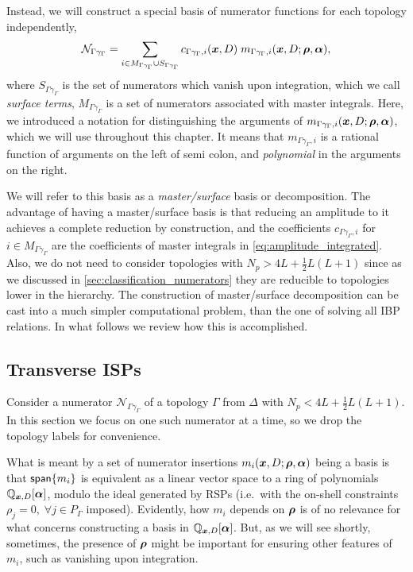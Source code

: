 Instead, we will construct a special basis of numerator functions for each topology independently,
\begin{equation} \label{eq:master_surface_basis}
  \mathcal{N}_{\Gamma \gamma_\Gamma} = \sum_{i \in M_{\Gamma\gamma_\Gamma} \cup S_{\Gamma\gamma_\Gamma}} c_{\Gamma\gamma_\Gamma, i}(\vb*{x},D) \; m_{\Gamma\gamma_\Gamma, i} (\vb*{x},D;\vb*{\rho},\vb*{\alpha}),
\end{equation}
where $S_{\Gamma\gamma_\Gamma}$ is the set of numerators which vanish upon integration, which we call \emph{surface terms}, $M_{\Gamma\gamma_\Gamma}$ is a set of numerators associated with master integrals.
Here, we introduced a notation for distinguishing the arguments of $m_{\Gamma\gamma_\Gamma, i} (\vb*{x},D;\vb*{\rho},\vb*{\alpha})$,
which we will use throughout this chapter. 
It means that $m_{\Gamma\gamma_\Gamma, i}$ is a rational function of arguments on the left of semi colon, and \emph{polynomial} in the arguments on the right. 

We will refer to this basis as a \emph{master/surface} basis or decomposition.
The advantage of having a master/surface basis is that
reducing an amplitude to it achieves
a complete reduction by construction,
and the coefficients $c_{\Gamma\gamma_\Gamma,i}$ for $i\in M_{\Gamma\gamma_\Gamma}$ are the coefficients
of master integrals in \cref{eq:amplitude_integrated}.
Also, we do not need to consider topologies with $N_p > 4L + \frac{1}{2}L(L+1)$ since as we discussed in \cref{sec:classification_numerators}
they are reducible to topologies lower in the hierarchy.
The construction of master/surface decomposition can be cast into a much simpler computational problem, than the one of solving all IBP relations.
In what follows we review how this is accomplished.


\subsection{Transverse ISPs}
\label{sec:traceless_completion}

Consider a numerator $\mathcal{N}_{\Gamma\gamma_\Gamma}$ of a topology $\Gamma$ from $\Delta$ with $N_p <  4L + \frac{1}{2}L(L+1)$.
In this section we focus on one such numerator at a time, so we drop the topology labels for convenience.

What is meant by a set of numerator insertions $m_{i}(\vb*{x},D;\vb*{\rho},\vb*{\alpha})$ being a basis is that
$\mathsf{span}\{m_{i}\}$ is equivalent as a linear vector space to a ring of polynomials $\mathbb{Q}_{\vb*{x},D}[\vb*{\alpha}]$,
modulo the ideal generated by RSPs (i.e.\ with the on-shell constraints $\rho_j = 0,\;\forall j\in P_\Gamma$ imposed).
Evidently, how $m_{i}$ depends on $\vb*{\rho}$ is of no relevance for what concerns constructing
a basis in $\mathbb{Q}_{\vb*{x},D}[\vb*{\alpha}]$. But, as we will see shortly, sometimes, the presence
of $\vb*{\rho}$ might be important for ensuring other features of $m_{i}$, such as vanishing
upon integration.

